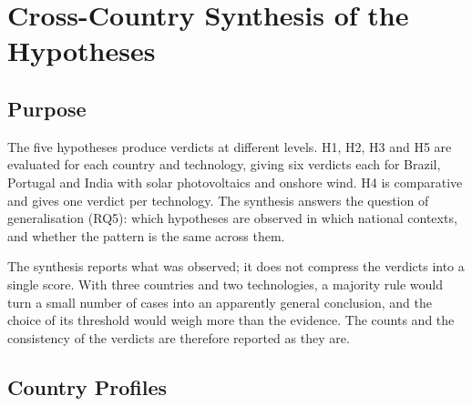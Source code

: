 
\section{Cross-Country Synthesis of the Hypotheses}
\label{sec:synthesis}

\subsection{Purpose}
\label{subsec:synthesis_purpose}

The five hypotheses produce verdicts at different levels. H1, H2, H3 and H5 are
evaluated for each country and technology, giving six verdicts each for Brazil,
Portugal and India with solar photovoltaics and onshore wind. H4 is comparative
and gives one verdict per technology. The synthesis answers the question of
generalisation (RQ5): which hypotheses are observed in which national contexts,
and whether the pattern is the same across them.

The synthesis reports what was observed; it does not compress the verdicts into
a single score. With three countries and two technologies, a majority rule would
turn a small number of cases into an apparently general conclusion, and the
choice of its threshold would weigh more than the evidence. The counts and the
consistency of the verdicts are therefore reported as they are.

\subsection{Country Profiles}
\label{subsec:synthesis_profiles}

